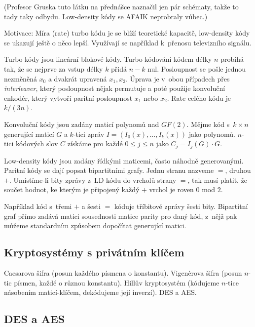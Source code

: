 (Profesor Gruska tuto látku na přednášce naznačil jen pár schématy, takže
to tady taky odbydu. Low-density kódy se AFAIK neprobraly vůbec.)


Motivace: Míra (rate) turbo kódu je se blíží teoretické kapacitě,
low-density kódy se ukazují ještě o něco lepší. Využívají se například
k~přenosu televizního signálu.

Turbo kódy jsou lineární blokové kódy.
Turbo kódování kódem délky $n$ probíhá tak, že se nejprve za vstup délky $k$ přidá $n -
k$ nul. Posloupnost se pošle jednou nezměněná $x_0$ a dvakrát upravená
$x_1, x_2$. Úprava
je v~obou případech přes {\em interleaver}, který posloupnost nějak
permutuje a poté použije konvoluční enkodér, který vytvoří paritní
posloupnost $x_1$ nebo $x_2$. Rate celého kódu je $k/(3n)$.

Konvoluční kódy jsou zadány maticí polynomů nad $GF(2)$. Mějme kód
s~$k\times n$ generující maticí $G$ a $k$-tici zpráv
$I = (I_0(x),\ldots,I_k(x))$ jako polynomů. $n$-tici kódových slov
$C$ získáme pro každé $0 \leq j \leq n$ jako $C_j = I_j(G) \cdot G$.


Low-density kódy jsou zadány řídkými maticemi, často náhodně
generovanými. Paritní kódy se dají popsat bipartitními grafy.
Jednu stranu nazveme $=$, druhou $+$. Umístíme-li bity zprávy z~LD kódu
do vrcholů strany $=$, tak musí platit, že součet hodnot, ke kterým je
připojený každý $+$ vrchol je roven $0$ mod $2$.

Například kód s~třemi $+$ a šesti $=$ kóduje tříbitové zprávy šesti
bity. Bipartitní graf přímo zadává matici sousednosti matice parity pro
daný kód, z~nějž pak můžeme standardním způsobem dopočítat generující
matici.


\subsection{Kryptosystémy s privátním klíčem}

Caesarova šifra (posun každého písmena o konstantu).
Vigenèrova šifra (posun $n$-tic písmen, každé o různou konstantu).
Hillův kryptosystém (kódujeme $n$-tice násobením maticí-klíčem,
dekódujeme její inverzí). DES a AES.

\subsection{DES a AES}

